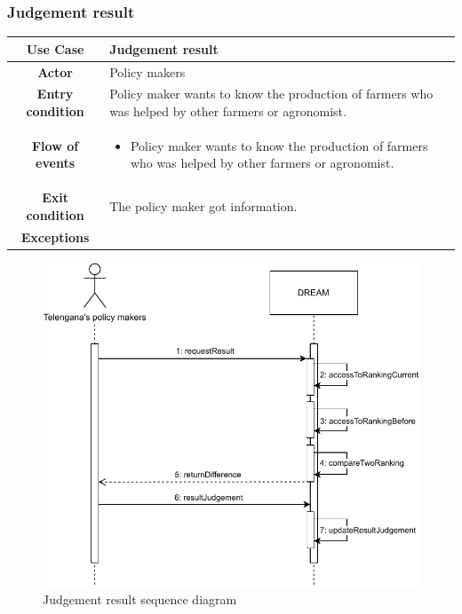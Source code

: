 \documentclass[../../main.tex]{subfiles}
\begin{document}
      \subsubsection{Judgement result}

      \begin{table}[H]
        \centering
          \begin{tabular}{c m{}}
          \hline
          \textbf{Use Case} & Judgement result \\ \hline
          \textbf{Actor} & Policy makers\\ \hline
          \textbf{Entry condition} & Policy maker wants to know the  production of farmers who was helped by other farmers or agronomist.\\  \hline
          \textbf{Flow of events} & \begin{itemize}
                                      \item Policy maker wants to know the production of farmers who was helped by other farmers or agronomist.
                                    \end{itemize}\\ \hline
          \textbf{Exit condition} & The policy maker got information. \\ \hline
          \textbf{Exceptions} & \\ \hline
          \end{tabular}
      \end{table}

      \begin{figure}[H]
        \centering
        \includegraphics[width=\textwidth]{RASD/image/Sequence_Diagram_Policy_maker-ResultJudgement.drawio.pdf}
        \caption{Judgement result sequence diagram}
      \end{figure}
\end{document}
